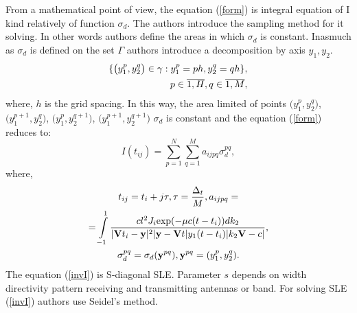 \documentclass{procDDs}
\begin{document}
From a mathematical point of view, the equation (\ref{form}) is integral equation of I kind relatively of function $\sigma_d$. The authors introduce the sampling method for it solving. In other words authors define the areas in which $\sigma_d$ is constant. Inasmuch as $\sigma_d$ is defined on the set $\Gamma$ authors introduce a decomposition by axis $y_1, y_2$.
\begin{align}
	\{ \big( y_1^p, y_2^q \big) \in\gamma: y_1^p = ph, y_2^q = qh \}, \notag \\ 
	p \in \overline{1, H}, q \in \overline{1, M}, 
\end{align}
where, $h$ is the grid spacing. In this way, the area limited of points $\big(y_1^p, y_2^q\big)$, $\big(y_1^{p+1}, y_2^q\big)$, $\big(y_1^p, y_2^{q+1}\big)$, $\big(y_1^{p+1}, y_2^{q+1}\big)$ $\sigma_d$  is constant and the equation (\ref{form}) reduces to:
\begin{equation}
\label{invI}
	I(t_{ij}) = \sum \limits_{p=1}^{N} \sum \limits_{q=1}^{M} a_{ijpq}\sigma_d^{pq},
\end{equation}
where,
\begin{multline*}
t_{ij} = t_i+j\tau, \tau = \frac{\Delta_t}{M}, a_{ijpq} = \\ 
=  \int\limits_{-1}^{1}
\frac{cl^2J_i \text{exp}(-\mu c(t-t_i))dk_2}{|\mathbf{V}t_i-\mathbf{y}|^2|\mathbf{y}-\mathbf{V}t|y_1(t-t_i)|k_2 \mathbf{V}-c|}, \\
\sigma_d^{pq} = \sigma_d(\textbf{y}^{pq}), \textbf{y}^{pq} = (y_1^p, y_2^q).
\end{multline*}
The equation (\ref{invI}) is S-diagonal SLE. Parameter $s$ depends on width directivity pattern receiving and transmitting antennas or band. For solving SLE (\ref{invI}) authors use  Seidel's method.
\end{document}
